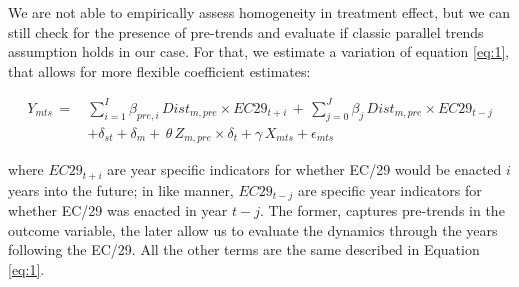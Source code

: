We are not able to empirically assess homogeneity in treatment effect, but we can still check for the presence of pre-trends and evaluate if classic parallel trends assumption holds in our case. For that, we estimate a variation of equation \ref{eq:1}, that allows for more flexible coefficient estimates:

\begin{equation} \label{eq:2}
\begin{aligned}
    Y_{mts} \, =  \, & \sum\limits_{i=1}^I \beta_{pre,i} \, Dist_{m,pre} \times EC29_{t+i} \, + \, \sum\limits_{j=0}^J \beta_{j} \, Dist_{m,pre} \times EC29_{t-j} \\  
             & +  \delta_{st} + \delta_m + \, \theta \, Z_{m,pre} \times \delta_{t} + \gamma \, X_{mts} +  \epsilon_{mts}
\end{aligned}
\end{equation}

where $EC29_{t+i}$ are year specific indicators for whether EC/29 would be enacted $i$ years into the future; in like manner, $EC29_{t-j}$ are specific year indicators for whether EC/29 was enacted in year $t-j$. The former, captures pre-trends in the outcome variable, the later allow us to evaluate the dynamics through the years following the EC/29. All the other terms are the same described in Equation \ref{eq:1}.










